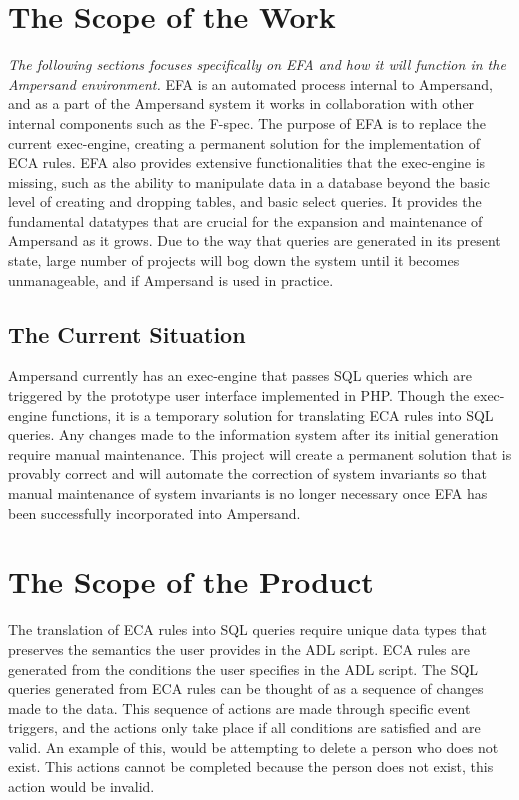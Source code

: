 \documentclass[12pt]{report}
\begin{document}
\section{The Scope of the Work}\label{sec:ScopeOfWork}
\textit{The following sections focuses specifically on EFA and how it will 
function in the Ampersand environment.}
EFA is an automated process internal to Ampersand, and as a part of the 
Ampersand system it works in collaboration with other internal components such 
as the F-spec. The purpose of EFA is to replace the current exec-engine, 
creating a permanent solution for the implementation of ECA rules. EFA also 
provides extensive functionalities that the exec-engine is missing, such as the 
ability to manipulate data in a database beyond the basic level of creating and 
dropping tables, and basic select queries. It provides the fundamental 
datatypes that are crucial for the expansion and maintenance of Ampersand as it 
grows. Due to the way that queries are generated in its present state, large 
number of projects will bog down the system until it becomes unmanageable, and 
if Ampersand is used in practice.

\subsection{The Current Situation} %

Ampersand currently has an exec-engine that passes SQL queries which are 
triggered by the prototype user interface implemented in PHP. Though the 
exec-engine functions, it is a temporary solution for translating ECA rules 
into SQL queries. Any changes made to the information system after its initial 
generation require manual maintenance. This project will create a permanent 
solution that is provably correct and will automate the correction of system 
invariants so that manual maintenance of system invariants is no longer 
necessary once EFA has been successfully incorporated into Ampersand.

\section{The Scope of the Product}\label{sec:ScopeOfProduct}
The translation of ECA rules into SQL queries require unique data types that 
preserves the semantics the user provides in the ADL script. ECA rules are 
generated from the conditions the user specifies in the ADL script. The SQL 
queries generated from ECA rules can be thought of as a sequence of changes 
made to the data. This sequence of actions are made through specific event 
triggers, and the actions only take place if all conditions are satisfied and 
are valid. An example of this, would be attempting to delete a person who does 
not exist. This actions cannot be completed because the person does not exist, 
this action would be invalid. 
\end{document}
